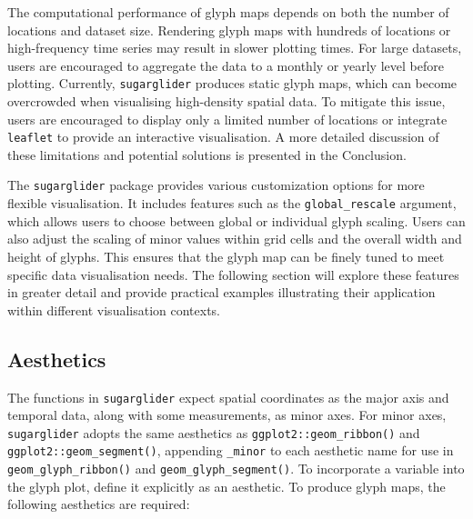 The computational performance of glyph maps depends on both the number of locations and dataset size. Rendering glyph maps with hundreds of locations or high-frequency time series may result in slower plotting times. For large datasets, users are encouraged to aggregate the data to a monthly or yearly level before plotting. Currently, \texttt{sugarglider} produces static glyph maps, which can become overcrowded when visualising high-density spatial data. To mitigate this issue, users are encouraged to display only a limited number of locations or integrate \texttt{leaflet} to provide an interactive visualisation. A more detailed discussion of these limitations and potential solutions is presented in the Conclusion.

The \texttt{sugarglider} package provides various customization options for more flexible visualisation. It includes features such as the \texttt{global\_rescale} argument, which allows users to choose between global or individual glyph scaling. Users can also adjust the scaling of minor values within grid cells and the overall width and height of glyphs. This ensures that the glyph map can be finely tuned to meet specific data visualisation needs. The following section will explore these features in greater detail and provide practical examples illustrating their application within different visualisation contexts.

\subsection{Aesthetics}\label{aesthetics}

The functions in \texttt{sugarglider} expect spatial coordinates as the major axis and temporal data, along with some measurements, as minor axes. For minor axes, \texttt{sugarglider} adopts the same aesthetics as \texttt{ggplot2::geom\_ribbon()} and \texttt{ggplot2::geom\_segment()}, appending \texttt{\_minor} to each aesthetic name for use in \texttt{geom\_glyph\_ribbon()} and \texttt{geom\_glyph\_segment()}. To incorporate a variable into the glyph plot, define it explicitly as an aesthetic. To produce glyph maps, the following aesthetics are required:


